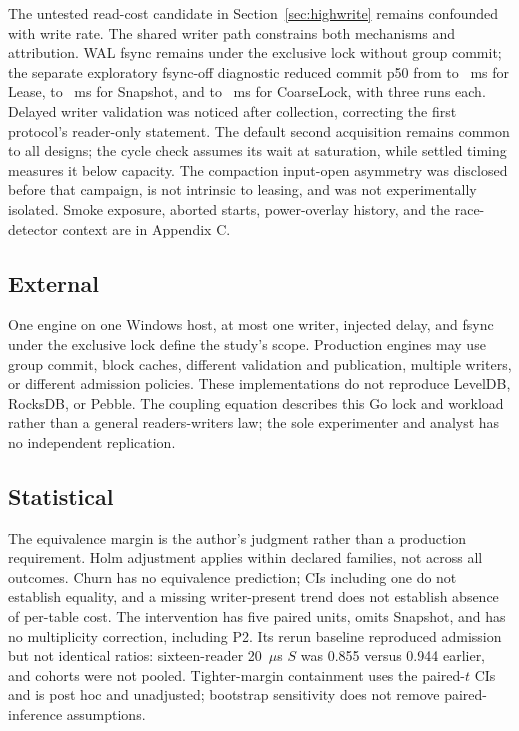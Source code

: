 \documentclass[conference]{IEEEtran}
\begin{document}
The untested read-cost candidate in Section~\ref{sec:highwrite} remains confounded with write rate. The shared writer path constrains both mechanisms and attribution. WAL fsync remains under the exclusive lock without group commit; the separate exploratory fsync-off diagnostic reduced commit p50 from \StallSyncOffLeaseOn{} to \StallSyncOffLeaseOff{}~ms for Lease, \StallSyncOffSnapshotOn{} to \StallSyncOffSnapshotOff{}~ms for Snapshot, and \StallSyncOffCLOn{} to \StallSyncOffCLOff{}~ms for CoarseLock, with three runs each. Delayed writer validation was noticed after collection, correcting the first protocol's reader-only statement. The default second acquisition remains common to all designs; the cycle check assumes its wait at saturation, while settled timing measures it below capacity. The compaction input-open asymmetry was disclosed before that campaign, is not intrinsic to leasing, and was not experimentally isolated. Smoke exposure, aborted starts, power-overlay history, and the race-detector context are in Appendix C.

\subsection{External}
One engine on one Windows host, at most one writer, injected delay, and fsync under the exclusive lock define the study's scope. Production engines may use group commit, block caches, different validation and publication, multiple writers, or different admission policies. These implementations do not reproduce LevelDB, RocksDB, or Pebble. The coupling equation describes this Go lock and workload rather than a general readers-writers law; the sole experimenter and analyst has no independent replication.

\subsection{Statistical}
The equivalence margin is the author's judgment rather than a production requirement. Holm adjustment applies within declared families, not across all outcomes. Churn has no equivalence prediction; CIs including one do not establish equality, and a missing writer-present trend does not establish absence of per-table cost. The intervention has five paired units, omits Snapshot, and has no multiplicity correction, including P2. Its rerun baseline reproduced admission but not identical ratios: sixteen-reader 20~$\mu$s $S$ was 0.855 versus 0.944 earlier, and cohorts were not pooled. Tighter-margin containment uses the paired-$t$ CIs and is post hoc and unadjusted; bootstrap sensitivity does not remove paired-inference assumptions.
\end{document}
